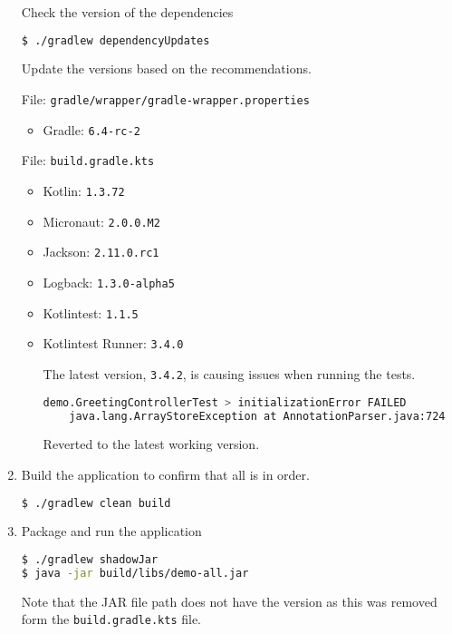 \begin{enumerate}
\begin{itemize}
\end{itemize}

Check the version of the dependencies

\begin{lstlisting}[language=bash]
$ ./gradlew dependencyUpdates
\end{lstlisting}

Update the versions based on the recommendations.

File: \texttt{gradle/wrapper/gradle-wrapper.properties}
\begin{itemize}
\item Gradle: \texttt{6.4-rc-2}
\end{itemize}

File: \texttt{build.gradle.kts}
\begin{itemize}
\item Kotlin: \texttt{1.3.72}
\item Micronaut: \texttt{2.0.0.M2}
\item Jackson: \texttt{2.11.0.rc1}
\item Logback: \texttt{1.3.0-alpha5}
\item Kotlintest: \texttt{1.1.5}
\item Kotlintest Runner: \texttt{3.4.0}

The latest version, \texttt{3.4.2}, is causing issues when running the tests.

\begin{lstlisting}[language=bash]
demo.GreetingControllerTest > initializationError FAILED
    java.lang.ArrayStoreException at AnnotationParser.java:724
\end{lstlisting}

Reverted to the latest working version.
\end{itemize}

\item Build the application to confirm that all is in order.

\begin{lstlisting}[language=bash]
$ ./gradlew clean build
\end{lstlisting}

\item Package and run the application

\begin{lstlisting}[language=bash]
$ ./gradlew shadowJar
$ java -jar build/libs/demo-all.jar
\end{lstlisting}

Note that the JAR file path does not have the version as this was removed form the \texttt{build.gradle.kts} file.


\end{enumerate}
